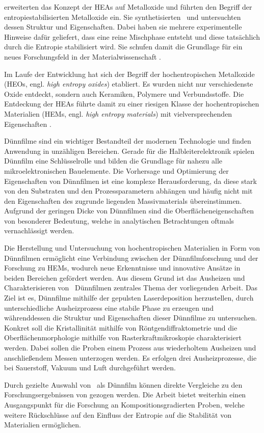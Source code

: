  erweiterten das Konzept der HEAs auf Metalloxide und führten den Begriff der
entropiestabilisierten Metalloxide ein.
Sie synthetisierten \heo\ und untersuchten dessen Struktur und Eigenschaften.
Dabei haben sie mehrere experimentelle Hinweise dafür geliefert, dass eine reine Mischphase entsteht und diese
tatsächlich durch die Entropie stabilisiert wird.
Sie schufen damit die Grundlage für ein neues Forschungsfeld in der Materialwissenschaft \autocite{Rost2015}.

Im Laufe der Entwicklung hat sich der Begriff der hochentropischen Metalloxide (HEOs, engl. \textit{high entropy oxides})
etabliert.
Es wurden nicht nur verschiedenste Oxide entdeckt, sondern auch Keramiken, Polymere und Verbundsstoffe.
Die Entdeckung der HEAs führte damit zu einer riesigen Klasse der hochentropischen Materialien (HEMs, engl.
\textit{high entropy materials}) mit vielversprechenden Eigenschaften \autocite{Yeh2018}.

Dünnfilme sind ein wichtiger Bestandteil der modernen Technologie und finden Anwendung in unzähligen Bereichen.
Gerade für die Halbleiterelektronik spielen Dünnfilm eine Schlüsselrolle und bilden die Grundlage für
nahezu alle mikroelektronischen Bauelemente.
Die Vorhersage und Optimierung der Eigenschaften von Dünnfilmen ist eine komplexe Herausforderung, da diese stark von
den Substraten und den Prozessparametern abhängen und häufig nicht mit den Eigenschaften des zugrunde liegenden
Massivmaterials übereinstimmen.
Aufgrund der geringen Dicke von Dünnfilmen sind die Oberflächeneigenschaften von besonderer Bedeutung, welche in
analytischen Betrachtungen oftmals vernachlässigt werden.

Die Herstellung und Untersuchung von hochentropischen Materialien in Form von Dünnfilmen ermöglicht eine Verbindung
zwischen der Dünnfilmforschung und der Forschung zu HEMs, wodurch neue Erkenntnisse und innovative
Ansätze in beiden Bereichen gefördert werden.
Aus diesem Grund ist das Ausheizen und Charakterisieren von \heo\ Dünnfilmen zentrales Thema der vorliegenden Arbeit.
Das Ziel ist es, Dünnfilme mithilfe der gepulsten Laserdeposition herzustellen, durch unterschiedliche
Ausheizprozess eine stabile Phase zu erzeugen und währenddessen die Struktur und Eigenschaften dieser Dünnfilme
zu untersuchen.
Konkret soll die Kristallinität mithilfe von Röntgendiffraktometrie und die Oberflächenmorphologie mithilfe von
Rasterkraftmikroskopie charakterisiert werden.
Dabei sollen die Proben einem Prozess aus wiederholtem Ausheizen und anschließendem Messen unterzogen werden.
Es erfolgen drei Ausheizprozesse, die bei Sauerstoff, Vakuum und Luft durchgeführt werden.

Durch gezielte Auswahl von \heo\ als Dünnfilm können direkte Vergleiche zu den Forschungsergebnissen von
 gezogen werden.
Die Arbeit bietet weiterhin einen Ausgangspunkt für die Forschung an Kompositionsgradierten Proben, welche weitere
Rückschlüsse auf den Einfluss der Entropie auf die Stabilität von Materialien ermöglichen.